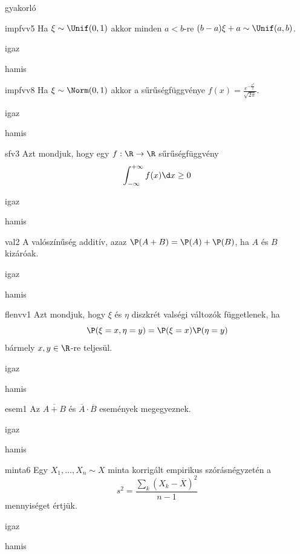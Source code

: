 \documentclass[12pt]{article}
\begin{document}
\begin{quiz}{gyakorló}

\begin{multi}[feedback={Egyenletes lineáris transzformáltja is egyenletes (a konstans elfajult esettől eltekintve)}]{impfvv5}
Ha $\xi\sim \Unif(0,1)$ akkor minden $a<b$-re $(b-a)\xi+a\sim \Unif(a,b)$.
\item* igaz
\item hamis
\end{multi}
\begin{multi}[feedback={Def.}]{impfvv8}
Ha $\xi\sim \Norm(0,1)$ akkor a sűrűségfüggvénye $f(x)=\frac{e^{-\frac{x^2}{2}}}{\sqrt{2\pi}}$.
\item* igaz
\item hamis
\end{multi}
\begin{multi}[feedback={$f\ge 0$ fontos (monoton nemcsökkenő $F$-nek a deriváltja)}]{sfv3}
Azt mondjuk, hogy egy $f:\R\to \R$ sűrűségfüggvény 
$$
\int_{-\infty}^{+\infty}f(x)\d x\ge 0
$$
\item igaz
\item* hamis
\end{multi}
\begin{multi}[feedback={Def.}]{val2}
A valószínűség additív, azaz $\P(A+B)=\P(A)+\P(B)$, ha $A$ és $B$ kizáróak.
\item* igaz
\item hamis
\end{multi}
\begin{multi}[feedback={Def.}]{flenvv1}
Azt mondjuk, hogy $\xi$ és $\eta$ diszkrét valségi változók függetlenek, ha
$$
\P(\xi=x,\eta=y)=\P(\xi=x)\P(\eta=y)
$$
bármely $x,y\in \R$-re teljesül.
\item* igaz
\item hamis
\end{multi}
\begin{multi}[feedback={de-Morgan azonosság}]{esem1}
Az $\overline{A+B}$ és $\overline{A} \cdot \overline{B}$ események megegyeznek.
\item* igaz
\item hamis
\end{multi}
\begin{multi}[feedback={Definíció.}]{minta6}
Egy $X_1,\ldots,X_n\sim X$ minta korrigált empirikus szórásnégyzetén a 
$$
s^2=\frac{\sum_{k} (X_k-\overline{X})^2}{n-1}
$$
mennyiséget értjük.
\item* igaz
\item hamis
\end{multi}

\end{quiz}
\end{document}
